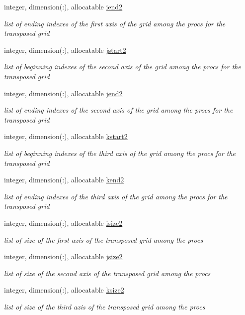 \begin{DoxyCompactItemize}
integer, dimension(\-:), allocatable \hyperlink{classfft_a8b21d9cc8827918443dc2864780d0b8e}{iend2}
\begin{DoxyCompactList}\small\item\em list of ending indexes of the first axis of the grid among the procs for the transposed grid \end{DoxyCompactList}\item 
integer, dimension(\-:), allocatable \hyperlink{classfft_a78b149c52f191d1999bc349321c63c8f}{jstart2}
\begin{DoxyCompactList}\small\item\em list of beginning indexes of the second axis of the grid among the procs for the transposed grid \end{DoxyCompactList}\item 
integer, dimension(\-:), allocatable \hyperlink{classfft_adf475ffd3fdc36883f33b56407809a4a}{jend2}
\begin{DoxyCompactList}\small\item\em list of ending indexes of the second axis of the grid among the procs for the transposed grid \end{DoxyCompactList}\item 
integer, dimension(\-:), allocatable \hyperlink{classfft_a70dc33801ee2d6b2ee67d09d28bd6110}{kstart2}
\begin{DoxyCompactList}\small\item\em list of beginning indexes of the third axis of the grid among the procs for the transposed grid \end{DoxyCompactList}\item 
integer, dimension(\-:), allocatable \hyperlink{classfft_a0f6315961060541f8c050b2fa944f28a}{kend2}
\begin{DoxyCompactList}\small\item\em list of ending indexes of the third axis of the grid among the procs for the transposed grid \end{DoxyCompactList}\item 
integer, dimension(\-:), allocatable \hyperlink{classfft_ac1c3bf32077bd22969d9e5092ec0a87c}{isize2}
\begin{DoxyCompactList}\small\item\em list of size of the first axis of the transposed grid among the procs \end{DoxyCompactList}\item 
integer, dimension(\-:), allocatable \hyperlink{classfft_a8f1f76f94641eff9c7ab779c8e04e49c}{jsize2}
\begin{DoxyCompactList}\small\item\em list of size of the second axis of the transposed grid among the procs \end{DoxyCompactList}\item 
integer, dimension(\-:), allocatable \hyperlink{classfft_ab61609735e4d327559a6a90691a0561b}{ksize2}
\begin{DoxyCompactList}\small\item\em list of size of the third axis of the transposed grid among the procs \end{DoxyCompactList}\end{DoxyCompactItemize}


